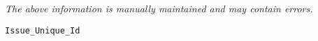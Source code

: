 \label{pkg:issue\_unique\_id}

{\tiny \it The above information is manually maintained and may contain errors.}
\begin{verbatim}
Issue_Unique_Id
\end{verbatim}
